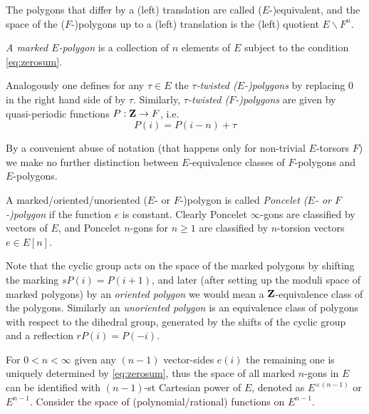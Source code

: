 The polygons that differ by a (left) translation
are called ($E$-)equivalent,
and the space of the ($F$-)polygons up to a (left) translation
is the (left) quotient $E \backslash F^n$.

\begin{definition} \label{d:marked-e-polygon}
\emph{A marked $E$-polygon}
is a collection of $n$ elements of $E$ subject
to the condition \eqref{eq:zerosum}.
\end{definition}

\begin{remark} \label{rem:twist}
Analogously one defines for any $τ\in E$ the \emph{$τ$-twisted ($E$-)polygons}
by replacing $0$ in the right hand side of  by $τ$.
Similarly, \emph{$τ$-twisted ($F$-)polygons} are given by
quasi-periodic functions $P : \mathbf{Z} \to F$, i.e.
\begin{equation} \label{eq:twisted-f-polygon}
P(i) = P(i-n) + τ
\end{equation}
\end{remark}

By a convenient abuse of notation
(that happens only for non-trivial $E$-torsors $F$)
we make no further distinction between $E$-equivalence classes of $F$-polygons
and $E$-polygons.

\begin{definition} \label{d:poncelet-polygon}
A marked/oriented/unoriented ($E$- or $F$-)polygon is called
\emph{Poncelet ($E$- or $F$-)polygon}
if the function $e$ is constant. Clearly Poncelet $\infty$-gons
are classified by vectors of $E$, and Poncelet $n$-gons for $n\geq 1$
are classified by $n$-torsion vectors $e \in E[n]$.
\end{definition}

Note that the cyclic group acts on the space of the marked polygons by shifting the marking
$s P(i) = P(i+1)$, and later (after setting up the moduli space of marked polygons)
by an \emph{oriented polygon} we would mean a $\mathbf{Z}$-equivalence class of the polygons.
Similarly an \emph{unoriented polygon} is an equivalence class of polygons with respect to the dihedral group,
generated by the shifts of the cyclic group and a reflection $r P(i) = P(-i)$.

For $0<n<\infty$ given any $(n-1)$ vector-sides $e(i)$
the remaining one is uniquely determined by \eqref{eq:zerosum},
thus the space of all marked $n$-gons in $E$ can be identified
with $(n-1)$-st Cartesian power of $E$,
denoted as $E^{\times (n-1)}$ or $E^{n-1}$.
Consider the space of (polynomial/rational) functions on $E^{n-1}$.


